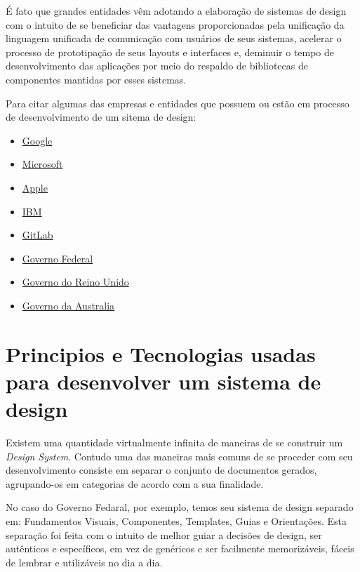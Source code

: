   É fato que grandes entidades vêm adotando a elaboração de sistemas de design com o intuito de se beneficiar das vantagens proporcionadas pela unificação da linguagem unificada de comunicação com usuários de seus sistemas, acelerar o processo de prototipação de seus layouts e interfaces e, deminuir o tempo de desenvolvimento das aplicações por meio do respaldo de bibliotecas de componentes mantidas por esses sistemas.

  Para citar algumas das empresas e entidades que possuem ou estão em processo de desenvolvimento de um sitema de design:

\begin{itemize}
  \item \href{https://material.io/design/}{Google}
  \item \href{https://www.microsoft.com/design/fluent/#/}{Microsoft}
  \item \href{https://developer.apple.com/design/}{Apple}
  \item \href{https://www.carbondesignsystem.com/}{IBM}
  \item \href{https://www.figma.com/community/plugin/860845891704482356/GitLab}{GitLab}
  \item \href{https://www.gov.br/governodigital/pt-br/transformacao-digital/ferramentas/design-system}{Governo Federal}
  \item \href{https://www.gov.uk/guidance/government-design-principles}{Governo do Reino Unido }
  \item \href{https://designsystem.gov.au/}{Governo da Australia}
\end{itemize}

\section{Principios e Tecnologias usadas para desenvolver um sistema de design}

  Existem uma quantidade virtualmente infinita de maneiras de se construir um \textit{Design System}. Contudo uma das maneiras mais comuns de se proceder com seu desenvolvimento consiste em separar o conjunto de documentos gerados, agrupando-os em categorias de acordo com a sua finalidade.

  No caso do Governo Fedaral, por exemplo, temos seu sistema de design separado em: Fundamentos Visuais, Componentes, Templates, Guias e Orientações. Esta separação foi feita com o intuito de melhor guiar a decisões de design, ser autênticos e específicos, em vez de genéricos e ser facilmente memorizáveis, fáceis de lembrar e utilizáveis no dia a dia. \cite{design_gov_federal}

